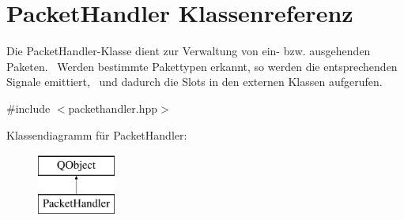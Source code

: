 \hypertarget{class_packet_handler}{}\section{Packet\+Handler Klassenreferenz}
\label{class_packet_handler}


Die Packet\+Handler-\/\+Klasse dient zur Verwaltung von ein-\/ bzw. ausgehenden Paketen.~\newline
 Werden bestimmte Pakettypen erkannt, so werden die entsprechenden Signale emittiert,~\newline
 und dadurch die Slots in den externen Klassen aufgerufen.  




{\ttfamily \#include $<$packethandler.\+hpp$>$}

Klassendiagramm für Packet\+Handler\+:\begin{figure}[H]
\begin{center}
\leavevmode
\includegraphics[height=2.000000cm]{class_packet_handler}
\end{center}
\end{figure}
